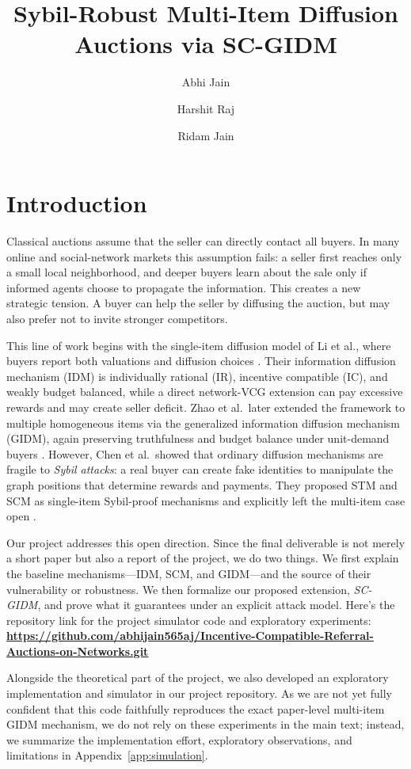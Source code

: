 \documentclass[sigconf]{aamas}
\title[Sybil-Robust Multi-Item Diffusion Auctions]{Sybil-Robust Multi-Item Diffusion Auctions via SC-GIDM}
\author{Abhi Jain}
\affiliation{%
  \institution{Indian Institute of Technology Bombay}
  \city{Mumbai}
  \country{India}}
\author{Harshit Raj}
\affiliation{%
  \institution{Indian Institute of Technology Bombay}
  \city{Mumbai}
  \country{India}}
\author{Ridam Jain}
\affiliation{%
  \institution{Indian Institute of Technology Bombay}
  \city{Mumbai}
  \country{India}}
\theoremstyle{definition}
\theoremstyle{remark}
\begin{document}
\maketitle

\section{Introduction}
Classical auctions assume that the seller can directly contact all buyers. In many online and social-network markets this assumption fails: a seller first reaches only a small local neighborhood, and deeper buyers learn about the sale only if informed agents choose to propagate the information. This creates a new strategic tension. A buyer can help the seller by diffusing the auction, but may also prefer not to invite stronger competitors.

This line of work begins with the single-item diffusion model of Li et al., where buyers report both valuations and diffusion choices \cite{LiHZZ17}. Their information diffusion mechanism (IDM) is individually rational (IR), incentive compatible (IC), and weakly budget balanced, while a direct network-VCG extension can pay excessive rewards and may create seller deficit. Zhao et al.\ later extended the framework to multiple homogeneous items via the generalized information diffusion mechanism (GIDM), again preserving truthfulness and budget balance under unit-demand buyers \cite{ZhaoLXHJ18}. However, Chen et al.\ showed that ordinary diffusion mechanisms are fragile to \emph{Sybil attacks}: a real buyer can create fake identities to manipulate the graph positions that determine rewards and payments. They proposed STM and SCM as single-item Sybil-proof mechanisms and explicitly left the multi-item case open \cite{ChenDWWZ23}.

Our project addresses this open direction. Since the final deliverable is not merely a short paper but also a report of the project, we do two things. We first explain the baseline mechanisms---IDM, SCM, and GIDM---and the source of their vulnerability or robustness. We then formalize our proposed extension, \emph{SC-GIDM}, and prove what it guarantees under an explicit attack model. Here's the repository link for the project simulator code and exploratory experiments: \textbf{\url{https://github.com/abhijain565aj/Incentive-Compatible-Referral-Auctions-on-Networks.git}}

Alongside the theoretical part of the project, we also developed an exploratory implementation and simulator in our project repository. As we are not yet fully confident that this code faithfully reproduces the exact paper-level multi-item GIDM mechanism, we do not rely on these experiments in the main text; instead, we summarize the implementation effort, exploratory observations, and limitations in Appendix~\ref{app:simulation}.
\end{document}
